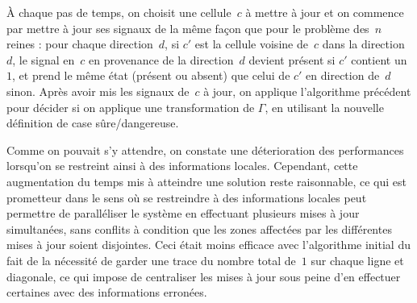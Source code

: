\documentclass[11pt, openany, a4paper]{article}
\begin{document}
À chaque pas de temps, on choisit une cellule~$c$ à mettre à jour et on commence par mettre à jour ses signaux de la même façon que pour le problème des~$n$ reines : pour chaque direction~$d$, si $c'$ est la cellule voisine de~$c$ dans la direction~$d$, le signal en~$c$ en provenance de la direction~$d$ devient présent si $c'$ contient un~$1$, et prend le même état (présent ou absent) que celui de $c'$ en direction de~$d$ sinon.
Après avoir mis les signaux de~$c$ à jour, on applique l'algorithme précédent pour décider si on applique une transformation de $\Gamma$, en utilisant la nouvelle définition de case sûre/dangereuse. 

Comme on pouvait s'y attendre, on constate une déterioration des performances lorsqu'on se restreint ainsi à des informations locales. Cependant, cette augmentation du temps mis à atteindre une solution reste raisonnable, ce qui est prometteur dans le sens où se restreindre à des informations locales peut permettre de paralléliser le système en effectuant plusieurs mises à jour simultanées, sans conflits à condition que les zones affectées par les différentes mises à jour soient disjointes. Ceci était moins efficace avec l'algorithme initial du fait de la nécessité de garder une trace du nombre total de~$1$ sur chaque ligne et diagonale, ce qui impose de centraliser les mises à jour sous peine d'en effectuer certaines avec des informations erronées.


\nocite{Pom96}
\nocite{BahiC06}
\nocite{Fat13}



\end{document}
